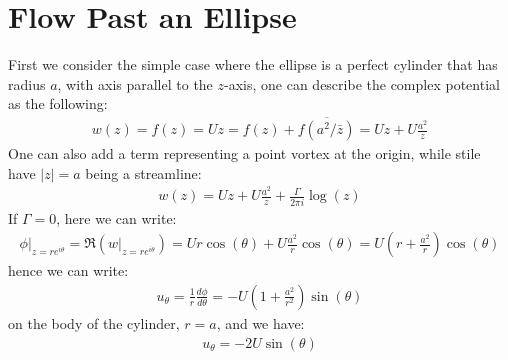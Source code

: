 \documentclass[11pt]{book}
\theoremstyle{break}
\theoremstyle{break}
\begin{document}
\newpage
\section[Flow Past an Ellipse]{\color{red}Flow Past an Ellipse\color{black}}
First we consider the simple case where the ellipse is a perfect cylinder that has radius $a$, with axis parallel to the $z$-axis, one can describe the complex potential as the following:
\begin{align*}
w(z) = f(z) = Uz = f(z) + \overline{f\left( a^2/\bar{z}\right)} = Uz + U\frac{a^2}{z}
\end{align*}
One can also add a term representing a point vortex at the origin, while stile have $|z| = a$ being a streamline:
\begin{align*}
w(z) =  Uz + U\frac{a^2}{z} + \frac{\Gamma}{2\pi i}\log(z)
\end{align*}
If $\Gamma = 0$, here we can write:
\begin{align*}
\phi|_{z = re^{i\theta}} = \Re(w|_{z = re^{i\theta}}) = Ur\cos(\theta) + U \frac{a^2}{r}\cos(\theta) = U\left( r + \frac{a^2}{r}\right) \cos(\theta)
\end{align*}
hence we can write:
\begin{align*}
u_{\theta} = \frac{1}{r}\frac{d\phi}{d\theta} = -U \left( 1+ \frac{a^2}{r^2}\right) \sin(\theta)
\end{align*}
on the body of the cylinder, $r=a$, and we have:
\begin{align*}
u_{\theta}  = -2U \sin(\theta) 
\end{align*}
\end{document}
